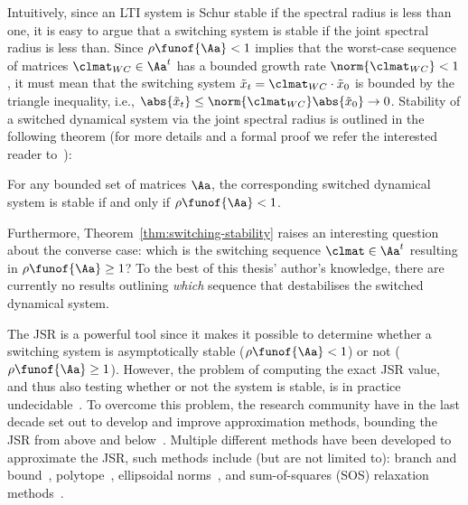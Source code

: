 Intuitively, since an LTI system is Schur stable if the spectral radius is less than one, it is easy to argue that a switching system is stable if the joint spectral radius is less than.
Since $\rho\funof{\Aa} < 1$ implies that the worst-case sequence of matrices $\clmat_{WC} \in \Aa^t$ has a bounded growth rate $\norm{\clmat_{WC}} < 1$, it must mean that the switching system $\tilde{x}_t = \clmat_{WC}\cdot \tilde{x}_0$ is bounded by the triangle inequality, i.e., $\abs{\tilde{x}_t} \leq \norm{\clmat_{WC}}\abs{\tilde{x}_0} \rightarrow 0$.
Stability of a switched dynamical system via the joint spectral radius is outlined in the following theorem (for more details and a formal proof we refer the interested reader to~\cite{Jungers:2009}): 
%
\begin{theorem}%
    \label{thm:switching-stability}%
    For any bounded set of matrices $\Aa$, the corresponding switched dynamical system is stable if and only if $\rho\funof{\Aa} < 1$.
\end{theorem}
%
Furthermore, Theorem~\ref{thm:switching-stability} raises an interesting question about the converse case: which is the switching sequence $\clmat \in \Aa^t$ resulting in $\rho\funof{\Aa} \geq 1$?
To the best of this thesis' author's knowledge, there are currently no results outlining \emph{which} sequence that destabilises the switched dynamical system.

The JSR is a powerful tool since it makes it possible to determine whether a switching system is asymptotically stable ($\rho\funof{\Aa} < 1$) or not ($\rho\funof{\Aa} \geq 1$).
However, the problem of computing the exact JSR value, and thus also testing whether or not the system is stable, is in practice undecidable~\cite{Blondel:2000}.
To overcome this problem, the research community have in the last decade set out to develop and improve approximation methods, bounding the JSR from above and below~\cite{Jungers:2009}.
Multiple different methods have been developed to approximate the JSR, such methods include (but are not limited to): branch and bound~\cite{Gripenberg:1996}, polytope~\cite{Protasov:1996}, ellipsoidal norms~\cite{Blondel:2005, John:2014}, and sum-of-squares (SOS) relaxation methods~\cite{Parrilo:2008, Wang:2021a, Wang:2021b}.

